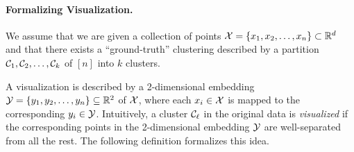 


\paragraph{Formalizing Visualization.}

We assume that we are given a  collection of points $\mathcal{X} = \{x_1, x_2, \ldots, x_n \} \subset \mathbb{R}^d$ and that there exists a ``ground-truth'' clustering described by a partition $\mathcal{C}_1, \mathcal{C}_2, \ldots, \mathcal{C}_k$ of $[n]$ into $k$ clusters. 

A visualization is described by a 2-dimensional embedding $\mathcal{Y} = \{y_1, y_2, \ldots, y_n\} \subseteq \mathbb{R}^2$ of $\mathcal{X}$, where each $x_i \in \mathcal{X}$ is mapped to the corresponding $y_i \in \mathcal{Y}$. Intuitively, a cluster $\mathcal{C}_\ell$ in the original data is \emph{visualized} if the corresponding points in the 2-dimensional embedding $\mathcal{Y}$ are well-separated from all the rest. The following definition formalizes this idea.




